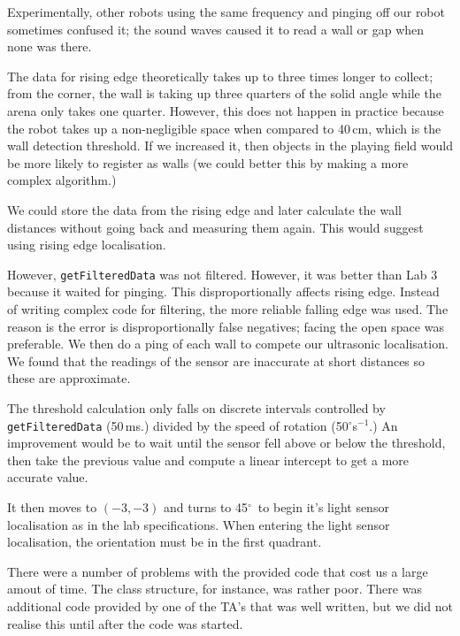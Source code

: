 \documentclass[twocolumn]{article}
\def\degree{\ensuremath{^\circ}}
\begin{document}
Experimentally, other robots using the same frequency and pinging off our robot sometimes confused it; the sound waves caused it to read a wall or gap when none was there.

The data for rising edge theoretically takes up to three times longer to collect; from the corner, the wall is taking up three quarters of the solid angle while the arena only takes one quarter. However, this does not happen in practice because the robot takes up a non-negligible space when compared to 40\,cm, which is the wall detection threshold. If we increased it, then objects in the playing field would be more likely to register as walls (we could better this by making a more complex algorithm.)

We could store the data from the rising edge and later calculate the wall distances without going back and measuring them again. This would suggest using rising edge localisation.

However, {\tt getFilteredData} was not filtered. However, it was better than Lab 3\cite{alexneil3} because it waited for pinging. This disproportionally affects rising edge. Instead of writing complex code for filtering, the more reliable falling edge was used. The reason is the error is disproportionally false negatives; facing the open space was preferable. We then do a ping of each wall to compete our ultrasonic localisation. We found that the readings of the sensor are inaccurate at short distances so these are approximate.

The threshold calculation only falls on discrete intervals controlled by {\tt getFilteredData} (50\,ms.) divided by the speed of rotation (50\degree s$^{-1}$.) An improvement would be to wait until the sensor fell above or below the threshold, then take the previous value and compute a linear intercept to get a more accurate value.

It then moves to $(-3, -3)$ and turns to 45\degree~to begin it's light sensor localisation as in the lab specifications\cite{lab4}. When entering the light sensor localisation, the orientation must be in the first quadrant.



There were a number of problems with the provided code that cost us a large amout of time. The class structure, for instance, was rather poor.
There was additional code provided by one of the TA's that was well written, but we did not realise this until after the code was started.
\end{document}
